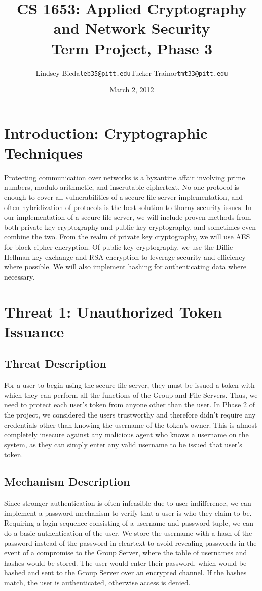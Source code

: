 \documentclass[11pt]{article}
\title{CS 1653: Applied Cryptography and Network Security\\Term Project, Phase 3}
\author{Lindsey Bieda\quad\texttt{leb35@pitt.edu}\qquad Tucker Trainor\quad\texttt{tmt33@pitt.edu}}
\date{March 2, 2012} %
\begin{document}
\maketitle
\section{Introduction: Cryptographic Techniques}
Protecting communication over networks is a byzantine affair involving prime numbers, modulo arithmetic, and inscrutable ciphertext. No one protocol is enough to cover all vulnerabilities of a secure file server implementation, and often hybridization of protocols is the best solution to thorny security issues. In our implementation of a secure file server, we will include proven methods from both private key cryptography and public key cryptography, and sometimes even combine the two. From the realm of private key cryptography, we will use AES for block cipher encryption. Of public key cryptography, we use the Diffie-Hellman key exchange and RSA encryption to leverage security and efficiency where possible. We will also implement hashing for authenticating data where necessary.
\section{Threat 1: Unauthorized Token Issuance}
\subsection{Threat Description}
For a user to begin using the secure file server, they must be issued a token with which they can perform all the functions of the Group and File Servers. Thus, we need to protect each user's token from anyone other than the user. In Phase 2 of the project, we considered the users trustworthy and therefore didn't require any credentials other than knowing the username of the token's owner. This is almost completely insecure against any malicious agent who knows a username on the system, as they can simply enter any valid username to be issued that user's token.
\subsection{Mechanism Description}
Since stronger authentication is often infeasible due to user indifference, we can implement a password mechanism to verify that a user is who they claim to be. Requiring a login sequence consisting of a username and password tuple, we can do a basic authentication of the user. We store the username with a hash of the password instead of the password in cleartext to avoid revealing passwords in the event of a compromise to the Group Server, where the table of usernames and hashes would be stored. The user would enter their password, which would be hashed and sent to the Group Server over an encrypted channel. If the hashes match, the user is authenticated, otherwise access is denied.
\end{document}
